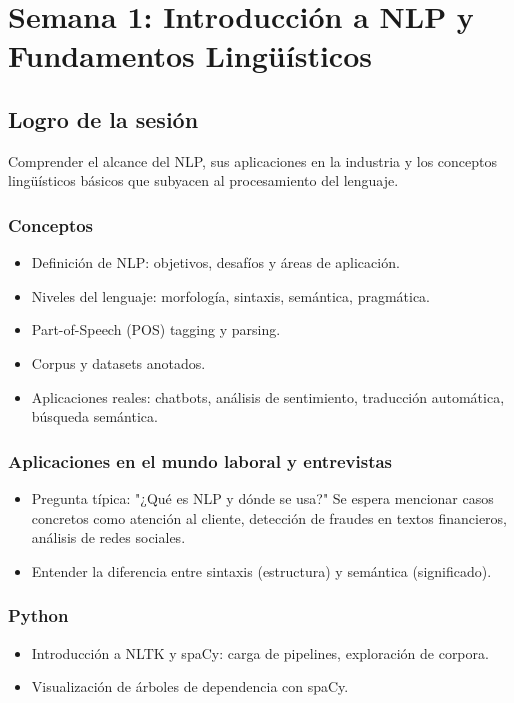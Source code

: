\documentclass[12pt,a4paper,openany,oneside]{book}
\begin{document}
\chapter{Semana 1: Introducción a NLP y Fundamentos Lingüísticos}

\section{Logro de la sesión}
Comprender el alcance del NLP, sus aplicaciones en la industria y los conceptos lingüísticos básicos que subyacen al procesamiento del lenguaje.

\subsection{Conceptos}
\begin{itemize}
    \item Definición de NLP: objetivos, desafíos y áreas de aplicación.
    \item Niveles del lenguaje: morfología, sintaxis, semántica, pragmática.
    \item Part-of-Speech (POS) tagging y parsing.
    \item Corpus y datasets anotados.
    \item Aplicaciones reales: chatbots, análisis de sentimiento, traducción automática, búsqueda semántica.
\end{itemize}

\subsection{Aplicaciones en el mundo laboral y entrevistas}
\begin{itemize}
    \item Pregunta típica: "¿Qué es NLP y dónde se usa?" Se espera mencionar casos concretos como atención al cliente, detección de fraudes en textos financieros, análisis de redes sociales.
    \item Entender la diferencia entre sintaxis (estructura) y semántica (significado).
\end{itemize}

\subsection{Python}
\begin{itemize}
    \item Introducción a NLTK y spaCy: carga de pipelines, exploración de corpora.
    \item Visualización de árboles de dependencia con spaCy.
\end{itemize}
\end{document}
